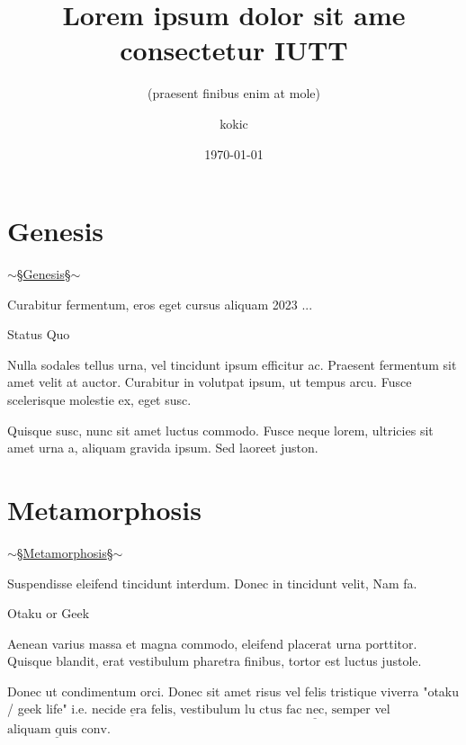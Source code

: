 \documentclass{beamer} %
\title[Lorem ipsum dolor sit ame]{Lorem ipsum dolor sit ame consectetur IUTT}
\subtitle{(praesent finibus enim at mole)}
\author %
{kokic\inst{1}}
\institute[UU] %
{
  \inst{1}%
  Information Science and Technology \\
  Unknown University
}
\date[presentation] %
{\today}
\newcommand{\decoratetext}[1]{\marcellus $\sim$\;\S\quad\underline{#1}\quad\S\;$\sim$}
\begin{document}
 

\frame{\titlepage}

\section{Genesis}
\begin{frame}\begin{center}
{\LARGE\decoratetext{Genesis}}
\vspace{1em}

Curabitur fermentum, eros eget cursus aliquam 2023 ...

\end{center}\end{frame}



\begin{frame}{Status Quo}

\noindent Nulla sodales tellus urna, vel tincidunt ipsum efficitur ac. Praesent fermentum sit amet velit at auctor. Curabitur in volutpat ipsum, ut tempus arcu. Fusce scelerisque molestie ex, eget susc.

Quisque susc, nunc sit amet luctus commodo. Fusce neque lorem, ultricies sit amet urna a, aliquam gravida ipsum. Sed laoreet juston.

\end{frame}


\section{Metamorphosis}
\begin{frame}\begin{center}
{\LARGE\decoratetext{Metamorphosis}}
\vspace{1em}

Suspendisse eleifend tincidunt interdum. Donec in tincidunt velit, Nam fa.
\end{center}\end{frame}




\begin{frame}{Otaku or Geek}

\noindent Aenean varius massa et magna commodo, eleifend placerat urna porttitor. Quisque blandit, erat vestibulum pharetra finibus, tortor est luctus justole.

Donec ut condimentum orci. Donec sit amet risus vel felis tristique viverra "otaku / geek life" i.e. $\underline{\text{necide era felis}}$, vestibulum lu $\underline{\text{ctus fac nec, semper}}$ vel $\underline{\text{aliquam quis conv}}$.

\end{frame}
\end{document}
